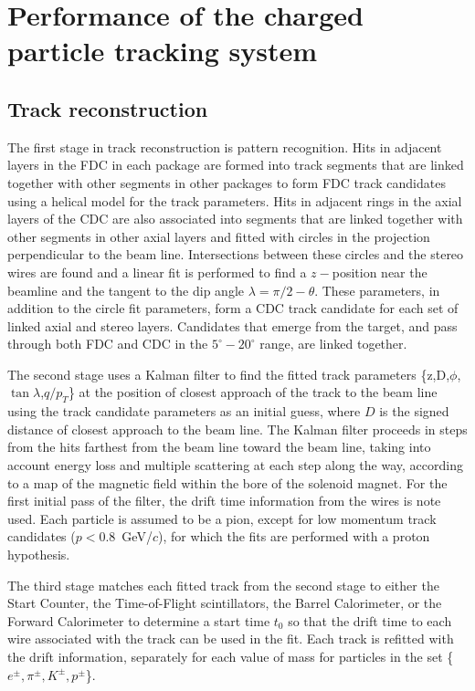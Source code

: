 \section[Performance of the charged particle tracking system (Simon)]{Performance of the charged particle tracking system \label{sec:trackingperformance}}
\subsection{Track reconstruction}

The first stage in track reconstruction is pattern recognition.  Hits in adjacent
 layers in the FDC in each package are formed into track segments that are 
linked together with other segments in other packages to form FDC track 
candidates using a helical model for the track parameters.
Hits in adjacent rings in the axial layers of the CDC are also associated into 
segments that are linked together with other segments in other axial layers
and fitted with circles in the projection perpendicular to the beam line. Intersections between these circles and the stereo wires are found and a linear fit is performed to find a $z-$position near the beamline and the tangent to the dip
 angle $\lambda=\pi/2-\theta$.  These parameters, in addition to the circle fit 
parameters, form a CDC track candidate for each set of linked axial and stereo 
layers. Candidates that emerge from the target, and pass through both FDC and CDC in the  $5^\circ-20^\circ$ range, are linked together.

The second stage uses a Kalman filter \cite{KalmanFilter, KalmanFilter2} to find the fitted track parameters
\{z,D,$\phi$,$\tan\lambda$,$q/p_T$\}
at the position of closest approach of the track to the beam line using the 
track candidate parameters as an initial guess, where $D$ is the signed 
distance of closest approach to the beam line.  The Kalman filter proceeds in 
steps from
the hits farthest from the beam line toward the beam line, taking into account
energy loss and multiple scattering at each step along the way, according to a
map of the magnetic field within the bore of the solenoid magnet.  For the 
first initial pass of the filter, the drift time information from the 
wires is note used.  Each particle is assumed to be a pion, except for low momentum track 
candidates ($p<0.8$~GeV/$c$), for which the fits are performed with a proton hypothesis.

The third stage matches each fitted track from the second 
stage to either the Start Counter, the Time-of-Flight scintillators, the Barrel Calorimeter, or the 
Forward Calorimeter to determine a start time $t_0$ so that the drift time to each wire 
associated with the track can be used in the fit.  Each track is refitted with
the drift information, separately for each value of mass for particles in the set \{$e^\pm,\pi^\pm,K^\pm,p^\pm$\}.




